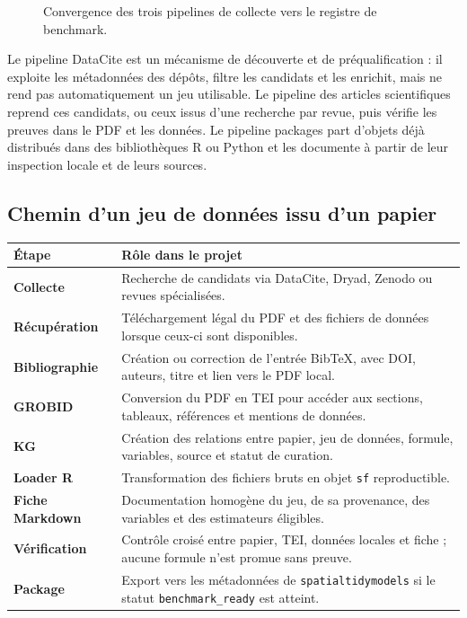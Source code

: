 \documentclass[11pt,a4paper]{article}
\begin{document}
\begin{figure}[htbp]
{}
\caption{Convergence des trois pipelines de collecte vers le registre de benchmark.}
\end{figure}

Le pipeline DataCite est un mécanisme de découverte et de préqualification : il exploite les métadonnées des dépôts, filtre les candidats et les enrichit, mais ne rend pas automatiquement un jeu utilisable. Le pipeline des articles scientifiques reprend ces candidats, ou ceux issus d'une recherche par revue, puis vérifie les preuves dans le PDF et les données. Le pipeline packages part d'objets déjà distribués dans des bibliothèques R ou Python et les documente à partir de leur inspection locale et de leurs sources.

\subsection{Chemin d'un jeu de données issu d'un papier}

\begin{center}
\small
\begin{tabularx}{\textwidth}{>{\bfseries}p{3.2cm}X}
\toprule
Étape & Rôle dans le projet \\
\midrule
Collecte & Recherche de candidats via DataCite, Dryad, Zenodo ou revues spécialisées. \\
Récupération & Téléchargement légal du PDF et des fichiers de données lorsque ceux-ci sont disponibles. \\
Bibliographie & Création ou correction de l'entrée BibTeX, avec DOI, auteurs, titre et lien vers le PDF local. \\
GROBID & Conversion du PDF en TEI pour accéder aux sections, tableaux, références et mentions de données. \\
KG & Création des relations entre papier, jeu de données, formule, variables, source et statut de curation. \\
Loader R & Transformation des fichiers bruts en objet \texttt{sf} reproductible. \\
Fiche Markdown & Documentation homogène du jeu, de sa provenance, des variables et des estimateurs éligibles. \\
Vérification & Contrôle croisé entre papier, TEI, données locales et fiche ; aucune formule n'est promue sans preuve. \\
Package & Export vers les métadonnées de \texttt{spatialtidymodels} si le statut \texttt{benchmark\_ready} est atteint. \\
\bottomrule
\end{tabularx}
\end{center}
\end{document}
